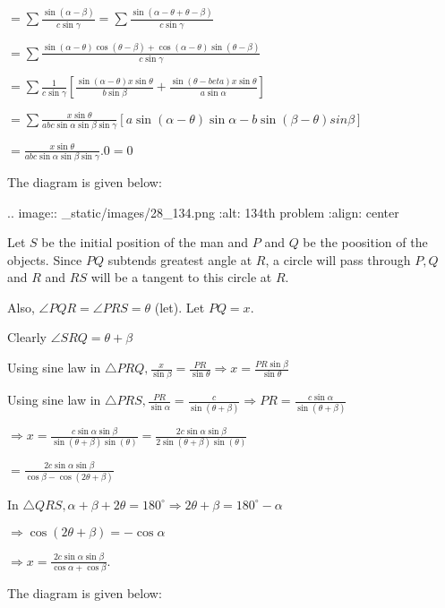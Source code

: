   $=\displaystyle\sum\frac{\sin(\alpha - \beta)}{c\sin\gamma} =
  \displaystyle\sum\frac{\sin(\alpha - \theta + \theta - \beta)}{c\sin\gamma}$

  $= \displaystyle\sum\frac{\sin(\alpha - \theta)\cos(\theta - \beta) + \cos(\alpha -
    \theta)\sin(\theta - \beta)}{c\sin\gamma}$

  $=\displaystyle\sum\frac{1}{c\sin\gamma}\left[\frac{\sin(\alpha - \theta)x\sin\theta}{b\sin\beta}
    + \frac{\sin(\theta - beta)x\sin\theta}{a\sin\alpha}\right]$

  $= \displaystyle\sum\frac{x\sin\theta}{abc\sin\alpha\sin\beta\sin\gamma}\left[a\sin(\alpha -
    \theta)\sin\alpha - b\sin(\beta - \theta)sin\beta\right]$

  $= \frac{x\sin\theta}{abc\sin\alpha\sin\beta\sin\gamma}.0 = 0$

\item The diagram is given below:

  .. image:: _static/images/28_134.png
  :alt: 134th problem
  :align: center

  Let $S$ be the initial position of the man and $P$ and $Q$ be the poosition of the
  objects. Since $PQ$ subtends greatest angle at $R$, a circle will pass through $P, Q$
  and $R$ and $RS$ will be a tangent to this circle at $R$.

  Also, $\angle PQR = \angle PRS = \theta$ (let). Let $PQ = x$.

  Clearly $\angle SRQ = \theta + \beta$

  Using sine law in $\triangle PRQ, \frac{x}{\sin\beta} = \frac{PR}{\sin\theta} \Rightarrow x =
  \frac{PR\sin\beta}{\sin\theta}$

  Using sine law in $\triangle PRS, \frac{PR}{\sin\alpha} = \frac{c}{\sin(\theta + \beta)}
  \Rightarrow PR = \frac{c\sin\alpha}{\sin(\theta + \beta)}$

  $\Rightarrow x = \frac{c\sin\alpha\sin\beta}{\sin(\theta + \beta)\sin(\theta)} =
  \frac{2c\sin\alpha\sin\beta}{2\sin(\theta + \beta)\sin(\theta)}$

  $= \frac{2c\sin\alpha\sin\beta}{\cos\beta - \cos(2\theta + \beta)}$

  In $\triangle QRS, \alpha + \beta + 2\theta = 180^\circ \Rightarrow 2\theta + \beta = 180^\circ -
  \alpha$

  $\Rightarrow \cos(2\theta + \beta) = -\cos\alpha$

  $\Rightarrow x = \frac{2c\sin\alpha\sin\beta}{\cos\alpha + \cos\beta}$.

\item The diagram is given below:

